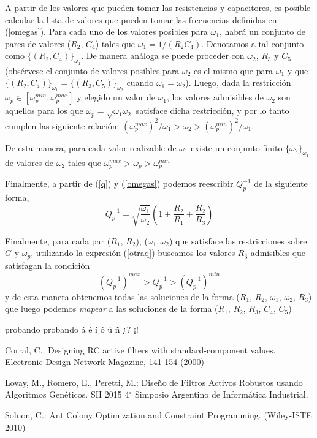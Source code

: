 \documentclass{llncs}
\begin{document}
    
    A partir de los valores que pueden tomar las resistencias y capacitores, es
    posible calcular la lista de valores que pueden tomar las frecuencias
    definidas en (\ref{omegas}). Para cada uno de los valores posibles para
    $\omega_1$, habr\'a un conjunto de pares de valores ($R_2$, $C_4$) tales que
    $\omega_1 = 1/(R_2 C_4)$. Denotamos a tal conjunto como $\{(R_2,
      C_4)\}_{\omega_1}$. De manera an\'aloga se puede proceder con $\omega_2$,
      $R_3$ y $C_5$ (obs\'ervese el conjunto de valores posibles para $\omega_2$
      es el mismo que para $\omega_1$ y que $\{(R_2,C_4)\}_{\omega_1}=\{(R_3,
      C_5)\}_{\omega_2}$ cuando $\omega_1=\omega_2$). Luego, dada la restricci\'on $\omega_p \in 
    [\omega_p^{min},\omega_p^{max}]$ y elegido un valor de  $\omega_1$, los
    valores admisibles de $\omega_2$ son aquellos para los 
    que $\omega_p= \sqrt{\omega_1 \omega_2}$ satisface dicha restricci\'on, y
    por lo tanto cumplen las siguiente relaci\'on:
    $(\omega_p^{max})^2 / \omega_1 > \omega_2 > (\omega_p^{min})^2 / \omega_1 $.

    De esta manera, para cada valor realizable de $\omega_1$ existe un conjunto
    finito $\{{\omega_2}\}_{\omega_1}$ de valores de $\omega_2$ 
    tales que $ \omega_p^{max} > \omega_p > \omega_p^{min} $

    Finalmente, a partir de (\ref{q}) y (\ref{omegas}) podemos reescribir
    $Q_p^{-1}$ de la siguiente forma,
    \begin{equation}
    Q_p^{-1} =
    \sqrt{\frac{\omega_1}{\omega_2}}\left(1+\frac{R_2}{R_1}+\frac{R_2}{R_3}\right)
    \label{otraq}
    \end{equation}
    
    Finalmente, para cada par ($R_1$, $R_2$), ($\omega_1, \omega_2$) que satisface
    las restricciones sobre $G$ y $\omega_p$, utilizando la expresión
    (\ref{otraq}) buscamos
    los valores $R_3$ admisibles que satisfagan la 
    condici\'on
    $$
    (Q_p^{-1})^{max} > Q_p^{-1} > (Q_p^{-1})^{min}
    $$
    y de esta manera obtenemos todas las soluciones de la forma ($R_1$, $R_2$,
    $\omega_1$, $\omega_2$, $R_3$)  
    que luego podemos \textit{mapear} a las soluciones de la forma ($R_1$,
    $R_2$, $R_3$, $C_4$, $C_5$) 

    probando probando á é í ó ú ñ ¿? ¡!
  \begin{thebibliography}{1}
      Corral, C.: 
      Designing RC active filters with standard-component values. Electronic Design
      Network Magazine, 141-154 (2000)
      
      Lovay, M., Romero, E., Peretti, M.:
      Dise\~no de Filtros Activos Robustos usando Algoritmos Gen\'eticos.
      SII 2015 4$^\circ$ Simposio Argentino de Inform\'atica Industrial.
      
      Solnon, C.:
      Ant Colony Optimization and Constraint Programming. (Wiley-ISTE 2010) 
  
  \end{thebibliography}
\end{document}
